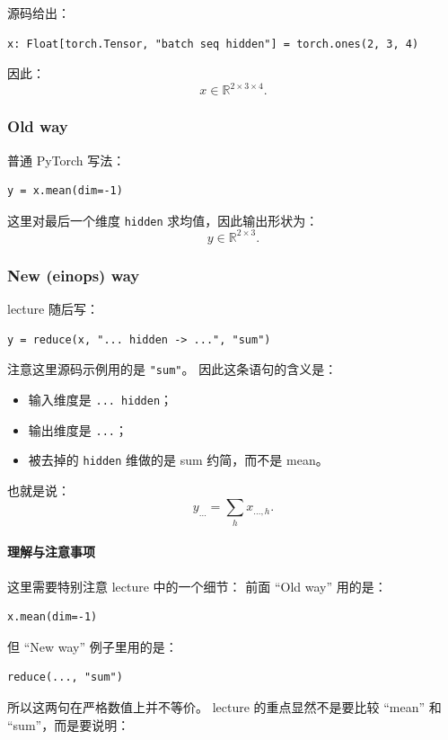 \documentclass[a4paper,UTF8]{article}
\numberwithin{equation}{section}
\begin{document}
源码给出：
\begin{verbatim}
x: Float[torch.Tensor, "batch seq hidden"] = torch.ones(2, 3, 4)
\end{verbatim}

因此：
\[
x \in \mathbb{R}^{2 \times 3 \times 4}.
\]

\subsubsection{Old way}

普通 PyTorch 写法：
\begin{verbatim}
y = x.mean(dim=-1)
\end{verbatim}

这里对最后一个维度 \verb|hidden| 求均值，因此输出形状为：
\[
y \in \mathbb{R}^{2 \times 3}.
\]

\subsubsection{New (einops) way}

lecture 随后写：
\begin{verbatim}
y = reduce(x, "... hidden -> ...", "sum")
\end{verbatim}

注意这里源码示例用的是 \verb|"sum"|。  
因此这条语句的含义是：
\begin{itemize}
    \item 输入维度是 \verb|... hidden|；
    \item 输出维度是 \verb|...|；
    \item 被去掉的 \verb|hidden| 维做的是 sum 约简，而不是 mean。
\end{itemize}

也就是说：
\[
y_{\ldots} = \sum_h x_{\ldots,h}.
\]

\paragraph{理解与注意事项}
这里需要特别注意 lecture 中的一个细节：  
前面 ``Old way'' 用的是：
\begin{verbatim}
x.mean(dim=-1)
\end{verbatim}
但 ``New way'' 例子里用的是：
\begin{verbatim}
reduce(..., "sum")
\end{verbatim}

所以这两句在严格数值上并不等价。  
lecture 的重点显然不是要比较 ``mean'' 和 ``sum''，而是要说明：
\end{document}
